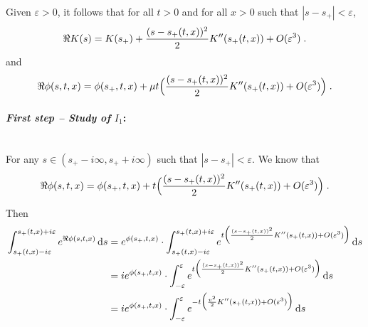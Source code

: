 Given $\varepsilon > 0$, it follows that for all $t > 0$ and for all $x>0$ such that $|s - s_+| < \varepsilon$, 
    \begin{equation}
        \begin{split}
        \Re K(s) = K(s_+) + \frac{(s - s_+(t,x))^2}{2} K''(s_+(t,x)) + O(\varepsilon^3)
        \; .
        \end{split}
    \end{equation}
and 
    \begin{equation}
        \Re \phi(s, t, x) = \phi(s_+, t, x) + \mu t \Big(\frac{(s - s_+(t,x))^2}{2} K''(s_+(t,x)) + O(\varepsilon^3)\Big)
        \; .
    \end{equation}
\medskip

\paragraph{\textit{First step -- Study of $I_1$}:}\mbox{}\\
For any $s \in (s_+ - i \infty, s_+ + i \infty)$ such that $|s - s_+| < \varepsilon$.
We know that 
    \begin{equation}
        \Re \phi(s, t, x) = \phi(s_+, t, x) + t \Big(\frac{(s - s_+(t,x))^2}{2} K''(s_+(t,x)) + O(\varepsilon^3)\Big)
        \; .
    \end{equation}

Then 
\begin{align*}
   \int_{s_+(t,x) - i\varepsilon}^{s_+(t,x) + i\varepsilon} e^{\Re \phi(s,t,x)} \, \mathrm ds
    &=
    e^{\phi(s_+, t, x)} \cdot \int_{s_+(t,x) - i\varepsilon}^{s_+(t,x) + i\varepsilon} e^{t \Big(\frac{(s - s_+(t,x))^2}{2} K''(s_+(t,x)) + O(\varepsilon^3)\Big)} \, \mathrm ds \\
    &= 
     i e^{\phi(s_+, t, x)} \cdot \int_{- \varepsilon}^{\varepsilon} e^{t \Big(\frac{(s - s_+(t,x))^2}{2} K''(s_+(t,x)) + O(\varepsilon^3)\Big)} \, \mathrm ds \\
    &= 
     i e^{\phi(s_+, t, x)} \cdot \int_{- \varepsilon}^{\varepsilon} e^{- t \Big(\frac{v^2}{2} K''(s_+(t,x)) + O(\varepsilon^3)\Big)} \, \mathrm ds 
\end{align*}

